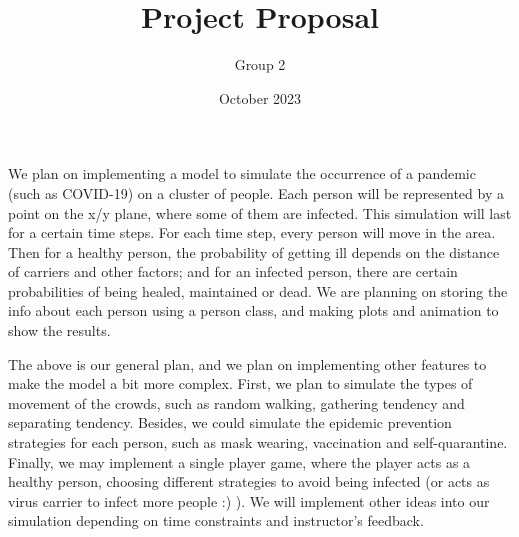 \documentclass{article}
\title{Project Proposal}
\author{Group 2}
\date{October 2023}
\begin{document}
\maketitle

We plan on implementing a model to simulate the occurrence of a pandemic (such as COVID-19) on a cluster of people. Each person will be represented by a point on the x/y plane, where some of them are infected. This simulation will last for a certain time steps. For each time step, every person will move in the area. Then for a healthy person, the probability of getting ill depends on the distance of carriers and other factors; and for an infected person, there are certain probabilities of being healed, maintained or dead. We are planning on storing the info about each person using a person class, and making plots and animation to show the results. \par

The above is our general plan, and we plan on implementing other features to make the model a bit more complex. First, we plan to simulate the types of movement of the crowds, such as random walking, gathering tendency and separating tendency. Besides, we could simulate the epidemic prevention strategies for each person, such as mask wearing, vaccination and self-quarantine. Finally, we may implement a single player game, where the player acts as a healthy person, choosing different strategies to avoid being infected (or acts as virus carrier to infect more people :) ). We will implement other ideas into our simulation depending on time constraints and instructor's feedback. 
\end{document}
